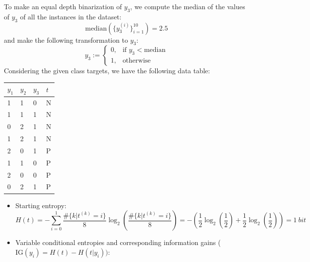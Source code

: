 \documentclass{exam}
\begin{document}
\begin{questions}
        \item To make an equal depth binarization of $y_3$, we compute the median of the values of $y_3$ of all the instances in the dataset:
        \begin{equation*}
             \text{median}(\{y^{(i)}_{3}\}_{i = 1}^{10}) = 2.5
        \end{equation*}
        and make the following transformation to $y_3$:
        \begin{equation*}
            y_3 :=
            \begin{cases}
                0, & \text{if } y_3 < \text{median} \\
                1, & \text{otherwise}
            \end{cases}
        \end{equation*}
        Considering the given class targets, we have the following data table:
        \begin{table}[H]
            \centering
            \begin{tabular}{llll}
            $y_1$ & $y_2$ & $y_3$ & $t$ \\ \hline
            1     & 1     & 0     & N   \\
            1     & 1     & 1     & N   \\
            0     & 2     & 1     & N   \\
            1     & 2     & 1     & N   \\
            2     & 0     & 1     & P   \\
            1     & 1     & 0     & P   \\
            2     & 0     & 0     & P   \\
            0     & 2     & 1     & P  
            \end{tabular}
        \end{table}
        \begin{itemize}
            \item Starting entropy:
            \begin{equation*}
                H(t) = - \sum_{i = 0}^{1}\frac{\#\{k|t^{(k)} = i\}}{8} \log_2\left(\frac{\#\{k|t^{(k)} = i\}}{8}\right) = - \left(\frac{1}{2}\log_2\left(\frac{1}{2}\right) + \frac{1}{2}\log_2\left(\frac{1}{2}\right)\right) = 1 \medspace bit
            \end{equation*}
            \item Variable conditional entropies and corresponding information gains ($\text{IG}(y_i) = H(t) - H(t|y_i))$:

\end{itemize}
\end{questions}
\end{document}
